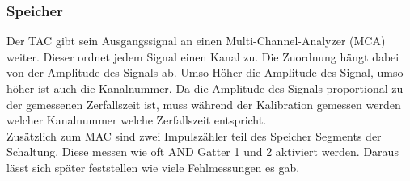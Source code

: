 \subsubsection{Speicher}
Der TAC gibt sein Ausgangssignal an einen Multi-Channel-Analyzer (MCA) weiter.
Dieser ordnet jedem Signal einen Kanal zu.
Die Zuordnung hängt dabei von der Amplitude des Signals ab.
Umso Höher die Amplitude des Signal, umso höher ist auch die Kanalnummer.
Da die Amplitude des Signals proportional zu der gemessenen Zerfallszeit ist, muss während der Kalibration gemessen werden welcher Kanalnummer welche Zerfallszeit entspricht.\\
Zusätzlich zum MAC sind zwei Impulszähler teil des Speicher Segments der Schaltung.
Diese messen wie oft AND Gatter 1 und 2 aktiviert werden.
Daraus lässt sich später feststellen wie viele Fehlmessungen es gab.
